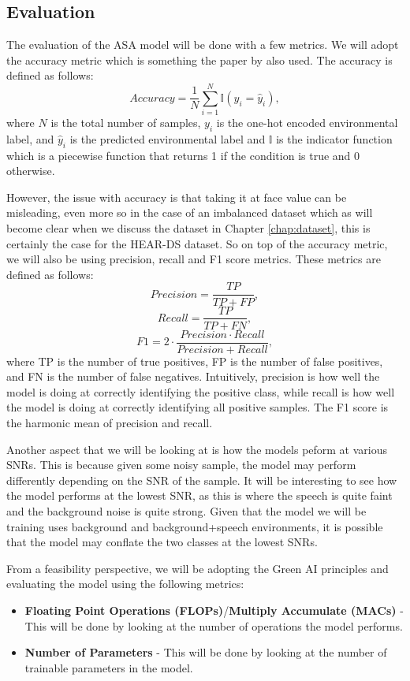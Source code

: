 \documentclass[logo,bsc,singlespacing,parskip,online]{infthesis}
\begin{document}
\subsection{Evaluation}
The evaluation of the ASA model will be done with a few metrics. 
We will adopt the accuracy metric which is something the paper by \citet{Huwel2020HearDS} also used.
The accuracy is defined as follows:
\[
Accuracy = \frac{1}{N} \sum_{i=1}^{N} \mathbb{I}(y_i = \hat{y}_i),
\]
where \(N\) is the total number of samples, \(y_i\) is the one-hot encoded environmental label, and \(\hat{y}_i\) is the predicted environmental label
and \(\mathbb{I}\) is the indicator function which is a piecewise function that returns 1 if the condition is true and 0 otherwise.

However, the issue with accuracy is that taking it 
at face value can be misleading, even more so in the case of an imbalanced dataset 
which as will become clear when we discuss the dataset in Chapter \ref{chap:dataset},
this is certainly the case for the HEAR-DS dataset. 
So on top of the accuracy metric, we will also be using precision, recall and F1 score metrics.
These metrics are defined as follows:
\[
Precision = \frac{TP}{TP + FP},
\]
\[
Recall = \frac{TP}{TP + FN},
\] 
\[
F1 = 2 \cdot \frac{Precision \cdot Recall}{Precision + Recall},
\]
where TP is the number of true positives, FP is the number of false positives, and FN is the number of false negatives.
Intuitively, precision is how well the model is doing at correctly identifying the positive class,
while recall is how well the model is doing at correctly identifying all positive samples.
The F1 score is the harmonic mean of precision and recall.

Another aspect that we will be looking at is how the models peform at various SNRs. 
This is because given some noisy sample, the model may perform differently depending on the SNR of the sample.
It will be interesting to see how the model performs at the lowest SNR,
as this is where the speech is quite faint and the background noise is quite strong. 
Given that the model we will be training uses background and background+speech environments,
it is possible that the model may conflate the two classes at the lowest SNRs.


From a feasibility perspective, we will be adopting the Green AI principles \citep{schwartz2019greenai} 
and evaluating the model using the following metrics:
\begin{itemize}
   \item \textbf{Floating Point Operations (FLOPs)}/\textbf{Multiply Accumulate (MACs)} - This will be done by looking at the number of operations the model performs.
   \item \textbf{Number of Parameters} - This will be done by looking at the number of trainable parameters in the model.
\end{itemize}
\end{document}
